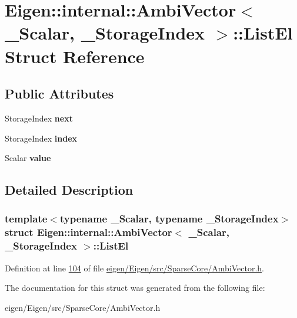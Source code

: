 \hypertarget{struct_eigen_1_1internal_1_1_ambi_vector_1_1_list_el}{}\section{Eigen\+:\+:internal\+:\+:Ambi\+Vector$<$ \+\_\+\+Scalar, \+\_\+\+Storage\+Index $>$\+:\+:List\+El Struct Reference}
\label{struct_eigen_1_1internal_1_1_ambi_vector_1_1_list_el}
\subsection*{Public Attributes}
\begin{DoxyCompactItemize}
\item 
\mbox{\label{struct_eigen_1_1internal_1_1_ambi_vector_1_1_list_el_afa83f47291dd2114ca74ca28123d9f3f}} 
Storage\+Index {\bfseries next}
\item 
\mbox{\label{struct_eigen_1_1internal_1_1_ambi_vector_1_1_list_el_aa28af060dd302f09a6293a5cec0fac08}} 
Storage\+Index {\bfseries index}
\item 
\mbox{\label{struct_eigen_1_1internal_1_1_ambi_vector_1_1_list_el_a91c7be4cafca17e1fcffb06c4b2448ef}} 
Scalar {\bfseries value}
\end{DoxyCompactItemize}


\subsection{Detailed Description}
\subsubsection*{template$<$typename \+\_\+\+Scalar, typename \+\_\+\+Storage\+Index$>$\newline
struct Eigen\+::internal\+::\+Ambi\+Vector$<$ \+\_\+\+Scalar, \+\_\+\+Storage\+Index $>$\+::\+List\+El}



Definition at line \hyperlink{eigen_2_eigen_2src_2_sparse_core_2_ambi_vector_8h_source_l00104}{104} of file \hyperlink{eigen_2_eigen_2src_2_sparse_core_2_ambi_vector_8h_source}{eigen/\+Eigen/src/\+Sparse\+Core/\+Ambi\+Vector.\+h}.



The documentation for this struct was generated from the following file\+:\begin{DoxyCompactItemize}
\item 
eigen/\+Eigen/src/\+Sparse\+Core/\+Ambi\+Vector.\+h\end{DoxyCompactItemize}
